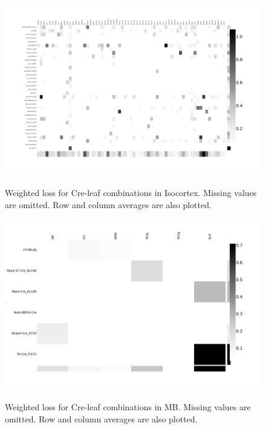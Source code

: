 \begin{figure}[H]
    \centering
    \includegraphics[width = 7in]{figs/lossdetails_315.png} 
    \label{fig:distances}
    \caption{Weighted loss for Cre-leaf combinations in Isocortex. Missing values are omitted.  Row and column averages are also plotted.}
\end{figure}

\begin{figure}[H]
    \centering
    \includegraphics[width = 7in]{figs/lossdetails_313.png} 
    \label{fig:distances}
    \caption{Weighted loss for Cre-leaf combinations in MB. Missing values are omitted.   Row and column averages are also plotted.}
\end{figure}

